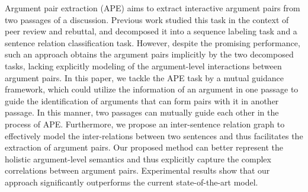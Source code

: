 Argument pair extraction (APE) aims to extract interactive argument pairs from two passages of a discussion. Previous work studied this task in the context of peer review and rebuttal, and decomposed it into a sequence labeling task and a sentence relation classification task. However, despite the promising performance, such an approach obtains the argument pairs implicitly by the two decomposed tasks, lacking explicitly modeling of the argument-level interactions between argument pairs. In this paper, we tackle the APE task by a mutual guidance framework, which could utilize the information of an argument in one passage to guide the identification of arguments that can form pairs with it in another passage. In this manner, two passages can mutually guide each other in the process of APE. Furthermore, we propose an inter-sentence relation graph to effectively model the inter-relations between two sentences and thus facilitates the extraction of argument pairs. Our proposed method can better represent the holistic argument-level semantics and thus explicitly capture the complex correlations between argument pairs. Experimental results show that our approach significantly outperforms the current state-of-the-art model.
